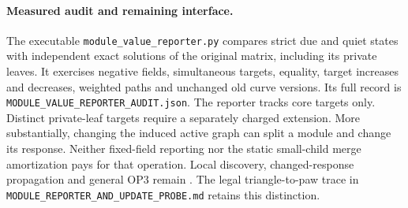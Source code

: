 \paragraph{Measured audit and remaining interface.}
The executable \texttt{module\_value\_reporter.py} compares strict due and
quiet states with independent exact solutions of the original matrix,
including its private leaves. It exercises negative fields, simultaneous
targets, equality, target increases and decreases, weighted paths and
unchanged old curve versions. Its full record is
\texttt{MODULE\_VALUE\_REPORTER\_AUDIT.json}. The reporter tracks core
targets only. Distinct private-leaf targets require a separately charged
extension. More substantially, changing the induced active graph can
split a module and change its response. Neither fixed-field reporting nor
the static small-child merge amortization pays for that operation.
Local discovery, changed-response propagation and general OP3 remain
\statusopen. The legal triangle-to-paw trace in
\texttt{MODULE\_REPORTER\_AND\_UPDATE\_PROBE.md} retains this distinction.

